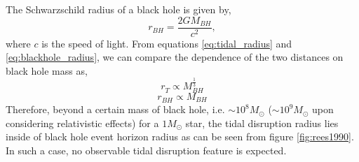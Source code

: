 \documentclass{tda}
\begin{document}
\noindent The Schwarzschild radius of a black hole is given by,
\begin{equation}
	r^{}_{BH} = \frac{2GM^{}_{BH}}{c^2},
	\label{eq:blackhole_radius}
\end{equation}
where \(c\) is the speed of light. From equations \ref{eq:tidal_radius} and \ref{eq:blackhole_radius}, we can compare the dependence of the two distances on black hole mass as,
\begin{equation}
	r^{}_{T} \propto M^{\frac{1}{3}}_{BH}
	\label{eq:tidal_radius_proportionality}
\end{equation}
\begin{equation}
	r^{}_{BH} \propto M^{}_{BH}
	\label{eq:blackhole_radius_proportionality}
\end{equation}
Therefore, beyond a certain mass of black hole, i.e. \(\sim10^8 M_{\odot}\) (\(\sim10^9 M_{\odot}\) upon considering relativistic effects) for a \(1 M_{\odot}\) star, the tidal disruption radius lies inside of black hole event horizon radius as can be seen from figure \ref{fig:rees1990}. In such a case, no observable tidal disruption feature is expected.
\end{document}
